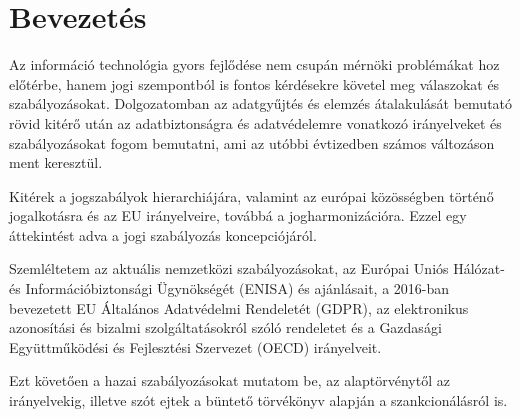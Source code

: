 \chapter{Bevezetés}

Az információ technológia gyors fejlődése nem csupán mérnöki problémákat hoz előtérbe, hanem jogi szempontból is fontos kérdésekre követel meg válaszokat és szabályozásokat. Dolgozatomban az adatgyűjtés és elemzés átalakulását bemutató rövid kitérő után az adatbiztonságra és adatvédelemre vonatkozó irányelveket és szabályozásokat fogom bemutatni, ami az utóbbi évtizedben számos változáson ment keresztül.

Kitérek a jogszabályok hierarchiájára, valamint az európai közösségben történő jogalkotásra és az EU irányelveire, továbbá a jogharmonizációra. Ezzel egy áttekintést adva a jogi szabályozás koncepciójáról.

Szemléltetem az aktuális nemzetközi szabályozásokat, az Európai Uniós Hálózat- és Információbiztonsági Ügynökségét (ENISA) és ajánlásait, a 2016-ban bevezetett EU Általános Adatvédelmi Rendeletét (GDPR), az elektronikus azonosítási és bizalmi szolgáltatásokról szóló rendeletet és a Gazdasági Együttműködési és Fejlesztési Szervezet (OECD) irányelveit.

Ezt követően a hazai szabályozásokat mutatom be, az alaptörvénytől az irányelvekig, illetve szót ejtek a büntető törvékönyv alapján a szankcionálásról is.